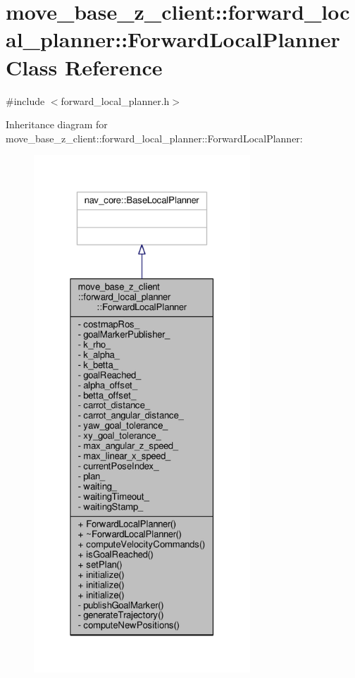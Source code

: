 \hypertarget{classmove__base__z__client_1_1forward__local__planner_1_1ForwardLocalPlanner}{}\section{move\+\_\+base\+\_\+z\+\_\+client\+:\+:forward\+\_\+local\+\_\+planner\+:\+:Forward\+Local\+Planner Class Reference}
\label{classmove__base__z__client_1_1forward__local__planner_1_1ForwardLocalPlanner}


{\ttfamily \#include $<$forward\+\_\+local\+\_\+planner.\+h$>$}



Inheritance diagram for move\+\_\+base\+\_\+z\+\_\+client\+:\+:forward\+\_\+local\+\_\+planner\+:\+:Forward\+Local\+Planner\+:\nopagebreak
\begin{figure}[H]
\begin{center}
\leavevmode
\includegraphics[height=550pt]{classmove__base__z__client_1_1forward__local__planner_1_1ForwardLocalPlanner__inherit__graph}
\end{center}
\end{figure}


